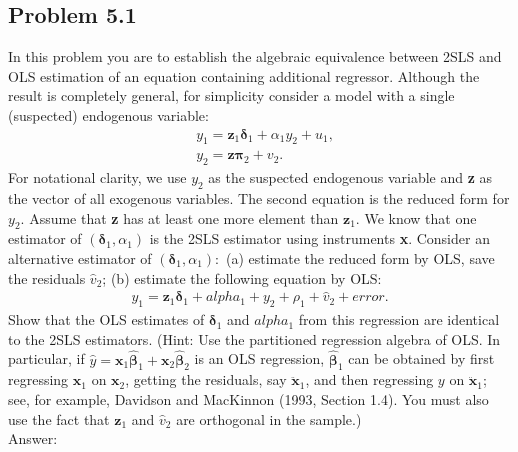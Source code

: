 \documentclass[10pt]{article}
\begin{document}
\subsection*{Problem 5.1}
In this problem you are to establish the algebraic equivalence between 2SLS and OLS estimation of an equation containing additional regressor. Although the result is completely general, for simplicity consider a model with a single (suspected) endogenous variable:
\begin{align*}
    &y_1=\textbf{z}_1\pmb{\delta}_1+\alpha_1y_2+u_1,\\
    &y_2=\textbf{z}\pmb{\pi}_2+v_2.
\end{align*}
For notational clarity, we use $y_2$ as the suspected endogenous variable and \textbf{z} as the vector of all exogenous variables. The second equation is the reduced form for $y_2.$ Assume that \textbf{z} has at least one more element than $\textbf{z}_1.$
We know that one estimator of $(\pmb{\delta}_1,\alpha_1)$ is the 2SLS estimator using instruments \textbf{x}. Consider an alternative estimator of $(\pmb{\delta}_1,\alpha_1):$ (a) estimate the reduced form by OLS, save the residuals $\hat{v}_2$; (b) estimate the following equation by OLS:
\begin{align}
    y_1=\textbf{z}_1\pmb{\delta}_1+alpha_1+y_2+\rho_1+\hat{v}_2+error. \tag{5.52} \label{5.52}
\end{align}
Show that the OLS estimates of $\pmb{\delta}_1$ and $alpha_1$ from this regression are identical to the 2SLS estimators. (Hint: Use the partitioned regression algebra of OLS. In particular, if $\hat{y}=\textbf{x}_1\hat{\pmb{\beta}}_1+\textbf{x}_2\hat{\pmb{\beta}}_2$ is an OLS regression, $\hat{\pmb{\beta}}_1$ can be obtained by first regressing $\textbf{x}_1$ on $\textbf{x}_2$, getting the residuals, say $\ddot{\textbf{x}}_1$, and then regressing $y$ on $\ddot{\textbf{x}}_1$; see, for example, Davidson and MacKinnon (1993, Section 1.4). You must also use the fact that $\textbf{z}_1$ and $\hat{v}_2$ are orthogonal in the sample.)\\ 
Answer: \\
\end{document}
